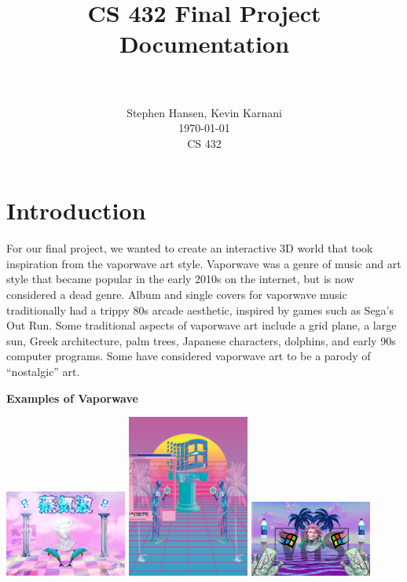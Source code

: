 \documentclass[10pt,letterpaper,oneside]{article}
\title{
		\usefont{OT1}{bch}{b}{n}
		\huge CS 432 Final Project Documentation \\
		\horrule{2pt} \\[0.5cm]
}
\author{
		\normalfont 
		\normalsize
		Stephen Hansen, Kevin Karnani\\
        \normalsize
        \today\\
        \normalsize
        CS 432
} \date{}
\numberwithin{equation}{section}		%
\numberwithin{figure}{section}			%
\numberwithin{table}{section}				%
\begin{document}
\maketitle\thispagestyle{empty}
\tableofcontents
\newpage
\clearpage
\setcounter{page}{1}
\section{Introduction}

For our final project, we wanted to create an interactive 3D world that took inspiration from the vaporwave art style. Vaporwave was a genre of music and art style that became popular in the early 2010s on the internet, but is now considered a dead genre. Album and single covers for vaporwave music traditionally had a trippy 80s arcade aesthetic, inspired by games such as Sega's Out Run. Some traditional aspects of vaporwave art include a grid plane, a large sun, Greek architecture, palm trees, Japanese characters, dolphins, and early 90s computer programs. Some have considered vaporwave art to be a parody of ``nostalgic'' art.

\noindent
\begin{center}
\textbf{Examples of Vaporwave}

\includegraphics[width=0.3\textwidth]{vaporwave2.jpg}
\includegraphics[width=0.3\textwidth]{vaporwave1.png}
\includegraphics[width=0.3\textwidth]{vaporwave3.jpg}
\end{center}
\end{document}
